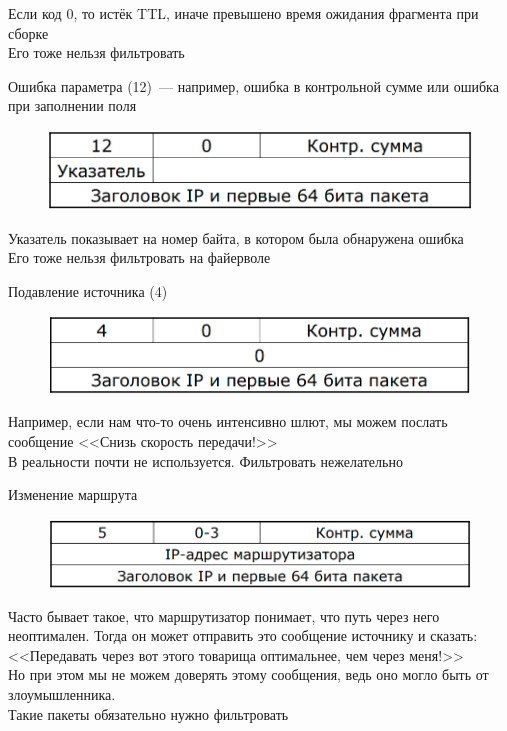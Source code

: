 \begin{MyItemize}
\begin{figure}[H]
    \end{figure}
    Если код 0, то истёк TTL, иначе превышено время ожидания фрагмента при сборке\\
    Его тоже нельзя фильтровать
    \item Ошибка параметра (12)~--- например, ошибка в контрольной сумме или ошибка при заполнении поля\\
    \begin{figure}[H]
        \centering
        \includegraphics[width=15cm]{images/02/12}
    \end{figure}
    Указатель показывает на номер байта, в котором была обнаружена ошибка\\
    Его тоже нельзя фильтровать на файерволе
\end{MyItemize}



\begin{MyItemize}
    \item Подавление источника (4)\\
    \begin{figure}[H]
        \centering
        \includegraphics[width=15cm]{images/02/13}
    \end{figure}
    Например, если нам что-то очень интенсивно шлют, мы можем послать сообщение <<Снизь скорость передачи!>>\\
    В реальности почти не используется. Фильтровать нежелательно
    \item Изменение маршрута\\
    \begin{figure}[H]
        \centering
        \includegraphics[width=15cm]{images/02/14}
    \end{figure}
    Часто бывает такое, что маршрутизатор понимает, что путь через него неоптимален. Тогда он может отправить это сообщение источнику и сказать: <<Передавать через вот этого товарища оптимальнее, чем через меня!>>\\
    Но при этом мы не можем доверять этому сообщения, ведь оно могло быть от злоумышленника.\\
    Такие пакеты обязательно нужно фильтровать
\end{MyItemize}

